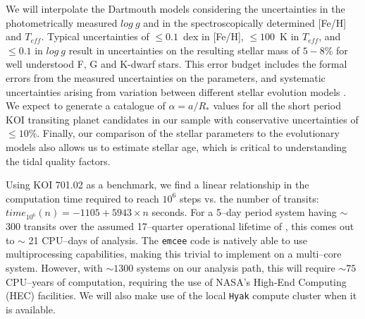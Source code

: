 We will interpolate the Dartmouth models considering the uncertainties
in the photometrically measured $log~g$ and in the spectroscopically
determined [Fe/H] and $T_{eff}$.  Typical uncertainties of $\le
0.1$~dex in [Fe/H], $\le 100$~K in $T_{eff}$, and $\le 0.1$ in $log~g$
result in uncertainties on the resulting stellar mass of $5-8$\% for
well understood F, G and K-dwarf stars.  This error budget includes
the formal errors from the measured uncertainties on the parameters,
and systematic uncertainties arising from variation between different
stellar evolution models
\citep[2-4\%;][]{Southworth2009}.  We expect to generate a
catalogue of $\alpha = a/R_*$ values for all the short period KOI
transiting planet candidates in our sample with conservative
uncertainties of $\le 10$\%.  Finally, our comparison of the stellar
parameters to the evolutionary models also allows us to estimate
stellar age, which is critical to understanding the tidal quality
factors.

\medskip
{\centerline{}}
\smallskip


Using KOI 701.02 as a benchmark, we find a linear relationship in the
computation time required to reach $10^6$ steps vs. the number of
transits: $time_{10^6}(n) = -1105 + 5943 \times n$ seconds.
%
For a 5--day period system having $\sim$ 300 transits over the assumed
17--quarter operational lifetime of \kepler, this comes out to $\sim$
21 CPU--days of analysis.  The {\tt emcee} code is natively able to
use multiprocessing capabilities, making this trivial to implement on
a multi--core system.  However, with $\sim 1300$ systems on our
analysis path, this will require $\sim 75$ CPU--years of computation,
requiring the use of NASA's High-End Computing (HEC) facilities.  We
will also make use of the local {\tt Hyak} compute cluster when it is
available.

